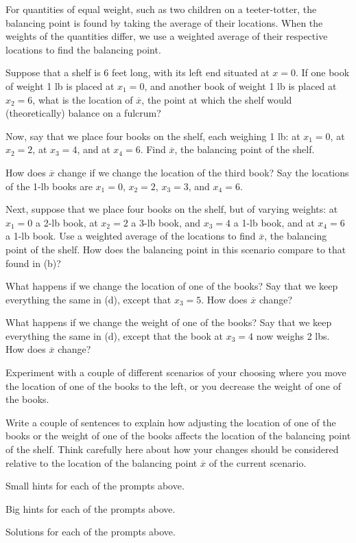 \begin{activity} \label{A:6.4.2} For quantities of equal weight, such as two children on a teeter-totter, the balancing point is found by taking the average of their locations.  When the weights of the quantities differ, we use a weighted average of their respective locations to find the balancing point. 
\ba
	\item Suppose that a shelf is 6 feet long, with its left end situated at $x = 0$.  If one book of weight 1 lb is placed at $x_1 = 0$, and another book of weight 1 lb is placed at $x_2 = 6$, what is the location of $\overline{x}$, the point at which the shelf would (theoretically) balance on a fulcrum?
	\item Now, say that we place four books on the shelf, each weighing 1 lb:  at $x_1 = 0$, at $x_2 = 2$, at $x_3 = 4$, and at $x_4 = 6$.  Find $\overline{x}$, the balancing point of the shelf.
	\item How does $\overline{x}$ change if we change the location of the third book?  Say the locations of the 1-lb books are  $x_1 = 0$, $x_2 = 2$, $x_3 = 3$, and $x_4 = 6$.  
	\item Next, suppose that we place four books on the shelf, but of varying weights:  at $x_1 = 0$ a 2-lb book, at $x_2 = 2$ a 3-lb book, and $x_3 = 4$ a 1-lb book, and at $x_4 = 6$ a 1-lb book.  Use a weighted average of the locations to find $\overline{x}$, the balancing point of the shelf.  How does the balancing point in this scenario compare to that found in (b)?
	\item What happens if we change the location of one of the books?  Say that we keep everything the same in (d), except that $x_3 = 5$.  How does $\overline{x}$ change?  
	\item What happens if we change the weight of one of the books?  Say that we keep everything the same in (d), except that the book at $x_3 = 4$ now weighs 2 lbs.  How does $\overline{x}$ change?
	\item Experiment with a couple of different scenarios of your choosing where you move the location of one of the books to the left, or you decrease the weight of one of the books.
	\item Write a couple of sentences to explain how adjusting the location of one of the books or the weight of one of the books affects the location of the balancing point of the shelf.  Think carefully here about how your changes should be considered relative to the location of the balancing point $\overline{x}$ of the current scenario.
\ea

\end{activity}
\begin{smallhint}
\ba
	\item Small hints for each of the prompts above.
\ea
\end{smallhint}
\begin{bighint}
\ba
	\item Big hints for each of the prompts above.
\ea
\end{bighint}
\begin{activitySolution}
\ba
	\item Solutions for each of the prompts above.
\ea
\end{activitySolution}
\aftera